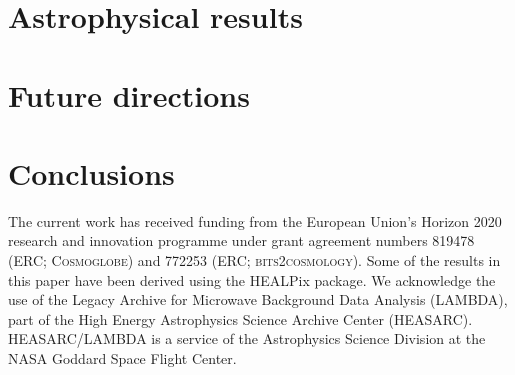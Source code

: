 \documentclass{aa}
\begin{document}
\clearpage
\section{Astrophysical results}

\clearpage
\section{Future directions}

\clearpage
\section{Conclusions}




\blindtext





\begin{acknowledgements}
 The current work has received funding from the European
  Union’s Horizon 2020 research and innovation programme under grant
  agreement numbers 819478 (ERC; \textsc{Cosmoglobe}) and 772253 (ERC;
  \textsc{bits2cosmology}). Some of the results in this paper have been derived using the HEALPix \citep{HEALPIX} package.
  We acknowledge the use of the Legacy Archive for Microwave Background Data
  Analysis (LAMBDA), part of the High Energy Astrophysics Science Archive Center
  (HEASARC). HEASARC/LAMBDA is a service of the Astrophysics Science Division at
  the NASA Goddard Space Flight Center.  
\end{acknowledgements}


%



\end{document}
